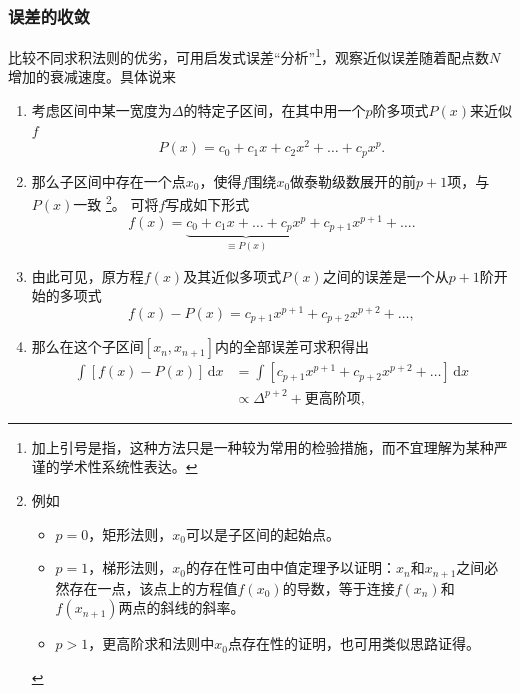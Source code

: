 \subsubsection{误差的收敛}
\label{sec:ninc-nc-error-convergence}
比较不同求积法则的优劣，可用启发式误差“分析”\footnote{加上引号是指，这种方法只是一种较为常用的检验措施，而不宜理解为某种严谨的学术性系统性表达。}，观察近似误差随着配点数$N$增加的衰减速度。具体说来
\begin{enumerate}
  \item 考虑区间中某一宽度为$\Delta$的特定子区间，在其中用一个$p$阶多项式$P(x)$来近似$f$
  \begin{equation*}
    P(x) = c_{0} + c_{1} x + c_{2} x^{2} + \ldots + c_{p} x^{p}.
  \end{equation*}
  \item 那么子区间中存在一个点$x_{0}$，使得$f$围绕$x_{0}$做泰勒级数展开的前$p+1$项，与$P(x)$一致
  \footnote{例如
  \begin{itemize}
    \item $p=0$，矩形法则，$x_{0}$可以是子区间的起始点。
    \item $p=1$，梯形法则，$x_{0}$的存在性可由中值定理予以证明：$x_{n}$和$x_{n+1}$之间必然存在一点，该点上的方程值$f\left( x_{0} \right)$的导数，等于连接$f \left(x_{n} \right)$和$f \left( x_{n+1} \right)$两点的斜线的斜率。
    \item $p >1$，更高阶求和法则中$x_{0}$点存在性的证明，也可用类似思路证得。
  \end{itemize}
  }。
  可将$f$写成如下形式
  \begin{equation*}
    f(x) = \underbrace{
    c_{0} + c_{1} x + \ldots + c_{p} x^{p} }_{\equiv P(x)}
    + c_{p+1} x^{p+1} + \ldots.
  \end{equation*}
  \item 由此可见，原方程$f(x)$及其近似多项式$P(x)$之间的误差是一个从$p+1$阶开始的多项式
  \begin{equation*}
    f(x) - P(x) = c_{p+1} x^{p+1} + c_{p+2} x^{p+2} + \ldots,
  \end{equation*}
  \item 那么在这个子区间$\left[ x_{n}, x_{n+1} \right]$内的全部误差可求积得出
  \begin{equation*}
    \begin{split}
      \int \left[ f(x) - P(x) \right] \, \mathrm{d} x
      & = \int \left[
      c_{p+1} x^{p+1} + c_{p+2} x^{p+2} + \ldots \right] \, \mathrm{d} x \\
      & \propto \Delta^{p+2} + \text{更高阶项},
    \end{split}

\end{equation*}
\end{enumerate}
